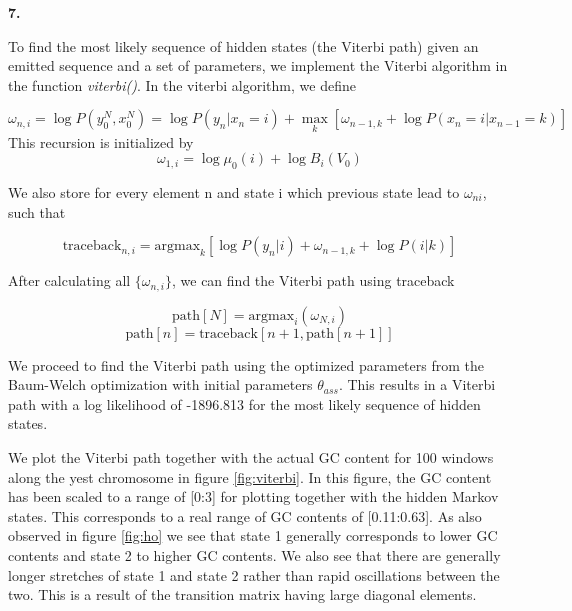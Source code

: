 \documentclass{article}
\begin{document}
\textbf{\large{7.}}


To find the most likely sequence of hidden states (the Viterbi path) given an emitted sequence and a set of parameters, we implement the Viterbi algorithm in the function \textit{viterbi()}. In the viterbi algorithm, we define

\begin{equation}
\omega_{n,i} = \log{P(y_0^N, x_0^N)} = \log{P(y_n|x_n = i)} + \max_k{[ \omega_{n-1, k} + \log{P(x_n =i | x_{n-1} = k)}]}
\end{equation}
This recursion is initialized by
\begin{equation}
\omega_{1,i} = \log{\mu_0(i)} + \log{B_i(V_0)} 
\end{equation}

We also store for every element n and state i which previous state lead to $\omega_{ni}$, such that

\begin{equation}
\text{traceback}_{n,i} = \text{argmax}_k [ {\log{P(y_n| i)} + \omega_{n-1,k} + \log{P(i |  k )}  } ] 
\end{equation}

After calculating all $ \{ \omega_{n,i} \} $, we can find the Viterbi path using traceback

\begin{equation}
\text{path}[N] = \text{argmax}_i(\omega_{N,i})
\end{equation}
\begin{equation}
\text{path}[n] = \text{traceback}[n+1, \text{path}[n+1]]
\end{equation}

We proceed to find the Viterbi path using the optimized parameters from the Baum-Welch optimization with initial parameters $\theta_{ass}$.
This results in a Viterbi path with a log likelihood of -1896.813 for the most likely sequence of hidden states.

We plot the Viterbi path together with the actual GC content for 100 windows along the yest chromosome in figure \ref{fig:viterbi}. In this figure, the GC content has been scaled to a range of [0:3] for plotting together with the hidden Markov states. This corresponds to a real range of GC contents of [0.11:0.63].
As also observed in figure \ref{fig:ho} we see that state 1 generally corresponds to lower GC contents and state 2 to higher GC contents.
We also see that there are generally longer stretches of state 1 and state 2 rather than rapid oscillations between the two. This is a result of the transition matrix having large diagonal elements.
\end{document}
